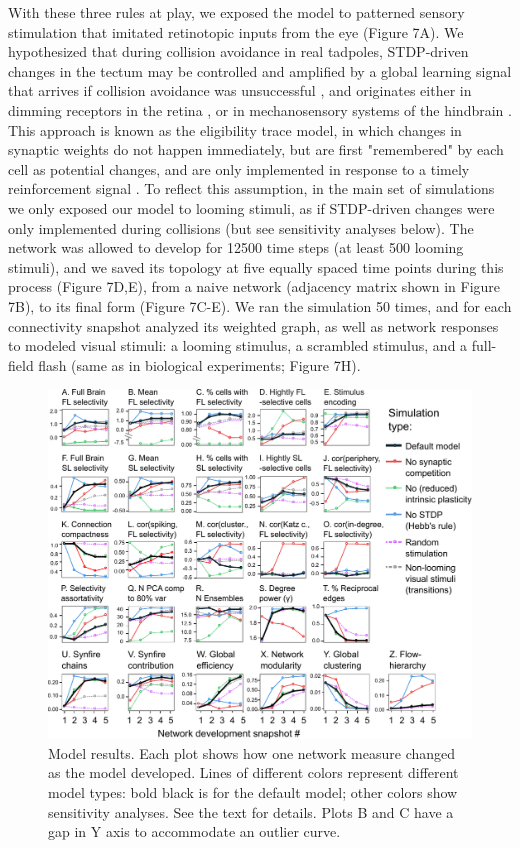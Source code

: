 \documentclass{article}
\begin{document}
With these three rules at play, we exposed the model to patterned sensory stimulation that imitated retinotopic inputs from the eye (Figure 7A). We hypothesized that during collision avoidance in real tadpoles, STDP-driven changes in the tectum may be controlled and amplified by a global learning signal that arrives if collision avoidance was unsuccessful \citep{savin2014stdpreward, aswolinskiy2015stdpreward, heap2018hypothalamic}, and originates either in dimming receptors in the retina \citep{baranauskas2012}, or in mechanosensory systems of the hindbrain \citep{pratt2009multisens, felch2016, truszkowski2017}. This approach is known as the eligibility trace model, in which changes in synaptic weights do not happen immediately, but are first "remembered" by each cell as potential changes, and are only implemented in response to a timely reinforcement signal \citep{seung2003trace}. To reflect this assumption, in the main set of simulations we only exposed our model to looming stimuli, as if STDP-driven changes were only implemented during collisions (but see sensitivity analyses below). The network was allowed to develop for 12500 time steps (at least 500 looming stimuli), and we saved its topology at five equally spaced time points during this process (Figure 7D,E), from a naive network (adjacency matrix shown in Figure 7B), to its final form (Figure 7C-E). We ran the simulation 50 times, and for each connectivity snapshot analyzed its weighted graph, as well as network responses to modeled visual stimuli: a looming stimulus, a scrambled stimulus, and a full-field flash (same as in biological experiments; Figure 7H).

\begin{figure}[t!]
\includegraphics[width=\linewidth]{fig8.pdf}
\caption{
Model results. Each plot shows how one network measure changed as the model developed. Lines of different colors represent different model types: bold black is for the default model; other colors show sensitivity analyses. See the text for details. Plots B and C have a gap in Y axis to accommodate an outlier curve. }
\end{figure}
\end{document}
